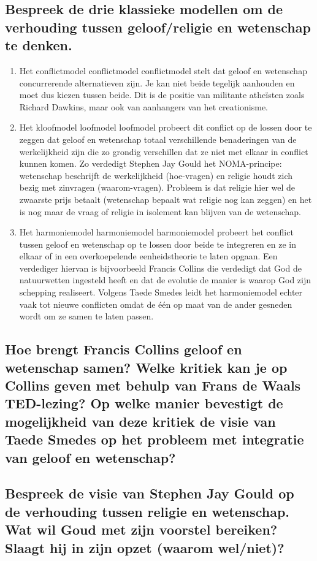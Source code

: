 \documentclass[11pt,a4paper,titlepage]{article}
\begin{document}
\subsection{Bespreek de drie klassieke modellen om de verhouding tussen geloof/religie en wetenschap te denken. }
\begin{enumerate}
\item Het conflictmodel conflictmodel conflictmodel stelt dat geloof en wetenschap concurrerende
alternatieven zijn. Je kan niet beide tegelijk aanhouden en moet dus
kiezen tussen beide. Dit is de positie van militante atheïsten zoals
Richard Dawkins, maar ook van aanhangers van het creationisme. 
\item Het kloofmodel loofmodel loofmodel probeert dit conflict op de lossen door te zeggen dat
geloof en wetenschap totaal verschillende benaderingen van de
werkelijkheid zijn die zo grondig verschillen dat ze niet met elkaar in
conflict kunnen komen. Zo verdedigt Stephen Jay Gould het NOMA-principe:
wetenschap beschrijft de werkelijkheid (hoe-vragen) en religie
houdt zich bezig met zinvragen (waarom-vragen). Probleem is dat
religie hier wel de zwaarste prijs betaalt (wetenschap bepaalt wat
religie nog kan zeggen) en het is nog maar de vraag of religie in
isolement kan blijven van de wetenschap. 
\item Het harmoniemodel harmoniemodel harmoniemodel probeert het conflict tussen geloof en wetenschap
op te lossen door beide te integreren en ze in elkaar of in een
overkoepelende eenheidstheorie te laten opgaan. Een verdediger
hiervan is bijvoorbeeld Francis Collins die verdedigt dat God de
natuurwetten ingesteld heeft en dat de evolutie de manier is waarop
God zijn schepping realiseert. Volgens Taede Smedes leidt het
harmoniemodel echter vaak tot nieuwe conflicten omdat de één op
maat van de ander gesneden wordt om ze samen te laten passen. 
\end{enumerate}
\subsection{Hoe brengt Francis Collins geloof en wetenschap samen? Welke kritiek kan je op Collins
geven met behulp van Frans de Waals TED-lezing? Op welke manier bevestigt de
mogelijkheid van deze kritiek de visie van Taede Smedes op het probleem met integratie van
geloof en wetenschap? }
\subsection{Bespreek de visie van Stephen Jay Gould op de verhouding tussen religie en wetenschap.
Wat wil Goud met zijn voorstel bereiken? Slaagt hij in zijn opzet (waarom wel/niet)?}
\end{document}
